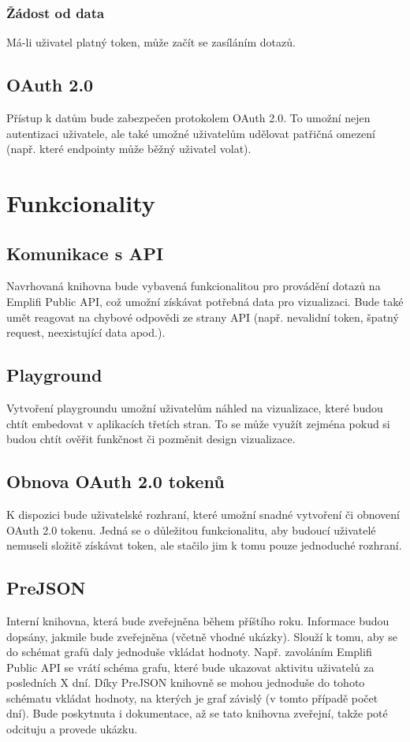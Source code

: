 \documentclass[czech, bc, kiv, he, iso690numb]{fasthesis}
\begin{document}
\subsubsection{Žádost od data}

Má-li uživatel platný token, může začít se zasíláním dotazů. 

\subsection{OAuth 2.0}
Přístup k datům bude zabezpečen protokolem OAuth 2.0. To umožní nejen autentizaci uživatele, ale také umožné uživatelům udělovat patřičná omezení (např. které endpointy může běžný uživatel volat).

\section{Funkcionality}

\subsection{Komunikace s API}
Navrhovaná knihovna bude vybavená funkcionalitou pro provádění dotazů na Emplifi Public API, což umožní získávat potřebná data pro vizualizaci.
Bude také umět reagovat na chybové odpovědi ze strany API (např. nevalidní token, špatný request, neexistující data apod.). 
\subsection{Playground}

Vytvoření playgroundu umožní uživatelům náhled na vizualizace, které budou chtít embedovat v aplikacích třetích stran. To se může využít zejména pokud si budou chtít ověřit funkčnost či pozměnit
design vizualizace. 
\subsection{Obnova OAuth 2.0 tokenů}

K dispozici bude uživatelské rozhraní, které umožní snadné vytvoření či obnovení OAuth 2.0 tokenu. Jedná se o důležitou funkcionalitu, aby budoucí uživatelé nemuseli složitě získávat
token, ale stačilo jim k tomu pouze jednoduché rozhraní. 
\subsection{PreJSON}
Interní knihovna, která bude zveřejněna během příštího roku. Informace budou dopsány, jakmile bude zveřejněna (včetně vhodné ukázky). Slouží k tomu, aby se do schémat grafů daly jednoduše
vkládat hodnoty. Např. zavoláním Emplifi Public API se vrátí schéma grafu, které bude ukazovat aktivitu uživatelů za posledních X dní. Díky PreJSON knihovně se mohou jednoduše do tohoto schématu
vkládat hodnoty, na kterých je graf závislý (v tomto případě počet dní). Bude poskytnuta i dokumentace, až se tato knihovna zveřejní, takže poté odcituju a provede ukázku.
\end{document}
